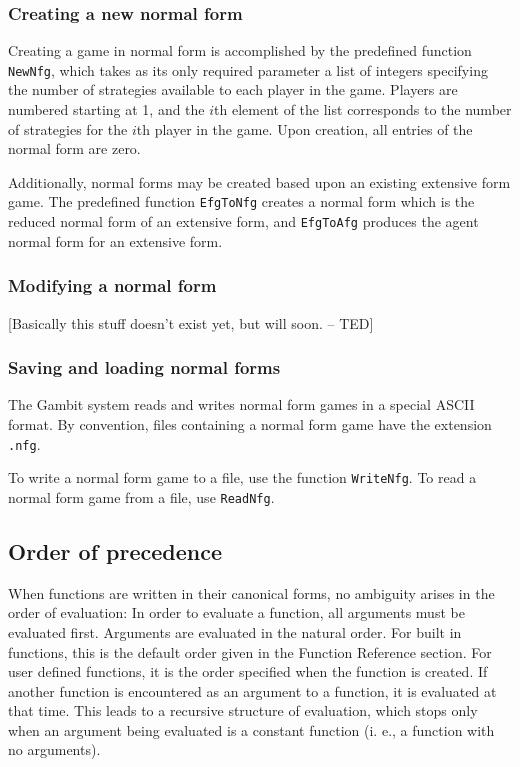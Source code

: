 \subsubsection{Creating a new normal form}

Creating a game in normal form is accomplished by the predefined function
\verb+NewNfg+, which takes as its only required parameter a list of integers
specifying the number of strategies available to each player in the game.
Players are numbered starting at 1, and the $i$th element of the list
corresponds to the number of strategies for the $i$th player in the game.
Upon creation, all entries of the normal form are zero.

Additionally, normal forms may be created based upon an existing extensive
form game.  The predefined function \verb+EfgToNfg+ creates a normal form
which is the reduced normal form of an extensive form, and \verb+EfgToAfg+
produces the agent normal form for an extensive form.

\subsubsection{Modifying a normal form}

[Basically this stuff doesn't exist yet, but will soon. -- TED]

\subsubsection{Saving and loading normal forms}

The Gambit system reads and writes normal form games in a special ASCII
format.  By convention, files containing a normal form game have the extension
\verb+.nfg+.

To write a normal form game to a file, use the function \verb+WriteNfg+.
To read a normal form game from a file, use \verb+ReadNfg+.

\subsection{Order of precedence}

When functions are written in their canonical forms, no ambiguity
arises in the order of evaluation: In order to evaluate a function,
all arguments must be evaluated first.  Arguments are evaluated in the
natural order.  For built in functions, this is the default order
given in the Function Reference section.  For user defined functions,
it is the order specified when the function is created.  If another
function is encountered as an argument to a function, it is evaluated
at that time.  This leads to a recursive structure of evaluation,
which stops only when an argument being evaluated is a constant
function (i. e., a function with no arguments).


